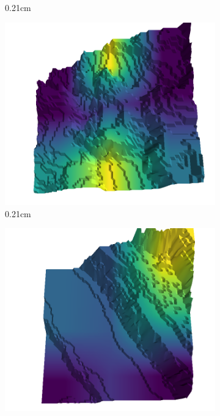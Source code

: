\documentclass[../document.tex]{subfiles}
\begin{document}
\begin{figure}[H]
\begin{subfigure}[b]{0.242\linewidth}
            \caption{0.21cm}
            \end{subfigure}
            \begin{subfigure}[b]{0.242\linewidth}
            \includegraphics[width=\linewidth]{../img/5/quarry/false_positive/24-patch-3d-majavi-colormap-20.png}
            \caption{0.21cm}
            \end{subfigure}
            \begin{subfigure}[b]{0.242\linewidth}
            \includegraphics[width=\linewidth]{../img/5/quarry/false_positive/25-patch-3d-majavi-colormap-25.png}

\end{subfigure}
\end{figure}
\end{document}
